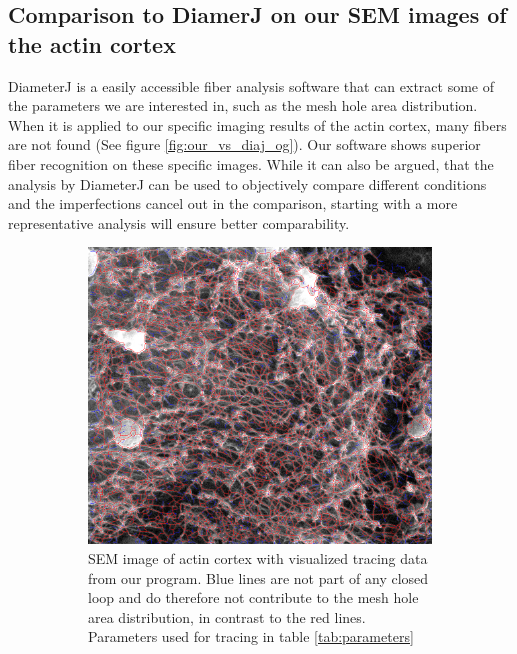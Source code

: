 \documentclass[12pt,english,twocolumn]{revtex4}
\begin{document}
\subsection{Comparison to DiamerJ on our SEM images of the actin cortex}
DiameterJ is a easily accessible fiber analysis software that can extract some of the parameters we are interested in, such as the mesh hole area distribution. When it is applied to our specific imaging results of the actin cortex, many fibers are not found (See figure \ref{fig:our_vs_diaj_og}). Our software shows superior fiber recognition on these specific images. While it can also be argued, that the analysis by DiameterJ can be used to objectively compare different conditions and the imperfections cancel out in the comparison, starting with a more representative analysis will ensure better comparability.
\begin{figure}[h]
    \centering
    \begin{subfigure}[b]{\linewidth}
        \includegraphics[width=.9\linewidth]{figures/new_trace_og.png}
        \caption{SEM image of actin cortex with visualized tracing data from our program. Blue lines are not part of any closed loop and do therefore not contribute to the mesh hole area distribution, in contrast to the red lines. Parameters used for tracing in table \ref{tab:parameters}}
        \label{subfig:our_traced_og}
    \end{subfigure}
    \begin{subfigure}[b]{\linewidth}

\end{subfigure}
\end{figure}
\end{document}
